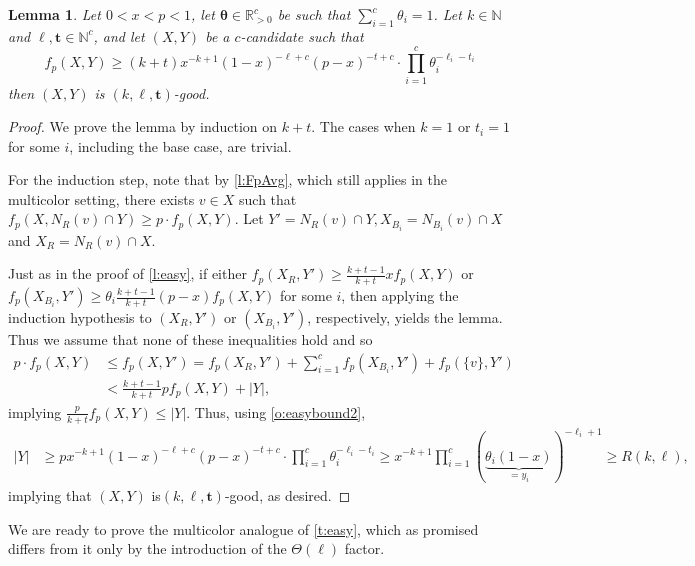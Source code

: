 \documentclass[reqno,final,12pt]{amsart}
\newtheorem{lem}[thm]{Lemma}
\newcommand{\bb}[1]{\mathbb{#1}}
\newcommand{\bl}[1]{\boldsymbol{#1}}
\newcommand{\s}[1]{\left(#1\right)}
\begin{document}
\begin{lem}\label{l:easy2}
	Let  $0<x<p<1$, let $\bl{\theta} \in  \bb{R}_{>0}^c$  be such that $\sum_{i=1}^c \theta_i=1$.  Let $k \in \bb{N}$ and  $\bl{\ell},\bl{t} \in \bb{N}^c$, and let $(X,Y)$ be a $c$-candidate such that 
	\begin{equation}\label{e:easymult}
	f_{p}(X,Y) \geq  (k+t)x^{-k+1}(1-x)^{-\ell+c}(p-x)^{-t+c}\cdot \prod_{i=1}^c\theta_i^{-\ell_i-t_i} 
	\end{equation}	
	then $(X,Y)$ is $(k,\bl{\ell},\bl{t})$-good.
\end{lem}

\begin{proof} 
	We prove the lemma by induction on $k+t$. The cases  when $k=1$ or $t_i=1$ for some $i$, including the base case, are trivial. 
	
For the induction step, note that by  
 \cref{l:FpAvg}, which still applies in the multicolor setting, there exists $v \in X$ such that  $f_p(X,N_R(v) \cap Y) \geq p \cdot f_p(X,Y)$. Let $Y' = N_R(v) \cap Y, X_ {B_i}=  N_{B_i}(v) \cap X$ and $X_R=  N_R(v) \cap X$.
	
	Just as in the proof of \cref{l:easy}, if either $f_p(X_R,Y') \geq \frac{k+t-1}{k+t} x f_p(X,Y)$ or  $f_p(X_{B_i},Y') \geq 
	\theta_i\frac{k+t-1}{k+t}(p-x) f_p(X,Y)$ for some $i$, then applying the induction hypothesis to  $(X_R,Y')$ or  $(X_{B_i},Y')$, respectively, yields the lemma. Thus we assume that none of these inequalities hold and so
	\begin{align*}
		p \cdot f_p(X,Y) &\leq f_p(X,Y') = f_p(X_R,Y') + \sum_{i=1}^c f_p(X_{B_i},Y') + f_p(\{v\},Y') \\ &< \frac{k+t-1}{k+t}pf_p(X,Y) + |Y|,
	\end{align*}
implying
 $\frac{p}{{k+t}}f_p(X,Y) \leq |Y|$.
	Thus, using \cref{o:easybound2},
\begin{align*}
	|Y| &\geq  p x^{-k+1}(1-x)^{-\ell+c}(p-x)^{-t+c}\cdot \prod_{i=1}^c\theta_i^{-\ell_i-t_i}  \geq x^{-k+1}\prod_{i=1}^c\s{ {\underbrace{\theta_i(1-x)}_{=y_i}}}^{-\ell_i+1} \geq  R(k,\bl{\ell}),
\end{align*}	
	implying that $(X,Y)$ is$(k,\bl{\ell},\bl{t})$-good, as desired. 
\end{proof}	

We are ready to prove the multicolor analogue of \cref{t:easy}, which as promised differs from it only by the introduction of the $\Theta(\bl{\ell})$ factor.
\end{document}
